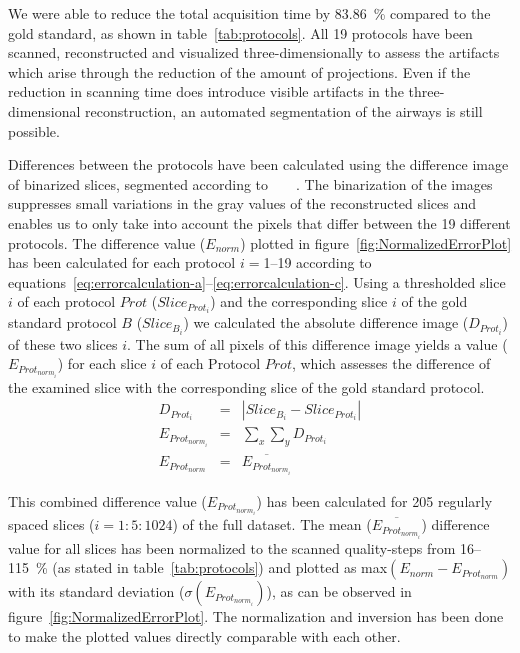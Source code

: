 We were able to reduce the total acquisition time by \SI{83.86}{\percent} compared to the gold standard, as shown in table~\ref{tab:protocols}. All 19 protocols have been scanned, reconstructed and visualized three-dimensionally to assess the artifacts which arise through the reduction of the amount of projections. Even if the reduction in scanning time does introduce visible artifacts in the three-dimensional reconstruction, an automated segmentation of the airways is still possible.

Differences between the protocols have been calculated using the difference image of binarized slices, segmented according to%
\ifhtml
	~\citet{Otsu1979}
\else
	~
\fi%
. The binarization of the images suppresses small variations in the gray values of the reconstructed slices and enables us to only take into account the pixels that differ between the 19 different protocols. The difference value ($E_{norm}$) plotted in figure~\ref{fig:NormalizedErrorPlot} has been calculated for each protocol $i=$1--19 according to equations~\ref{eq:errorcalculation-a}--\ref{eq:errorcalculation-c}. Using a thresholded slice $i$ of each protocol $Prot$ ($Slice_{Prot_{i}}$) and the corresponding slice $i$ of the gold standard protocol $B$ ($Slice_{B_{i}}$) we calculated the absolute difference image ($D_{Prot_{i}}$) of these two slices $i$. The sum of all pixels of this difference image yields a value ($E_{Prot_{norm_{i}}}$) for each slice $i$ of each Protocol $Prot$, which assesses the difference of the examined slice with the corresponding slice of the gold standard protocol.
\begin{eqnarray}%
	D_{Prot_{i}} &=& |Slice_{B_{i}}-Slice_{Prot_{i}}|\label{eq:errorcalculation-a}\\%
	E_{Prot_{norm_{i}}} &=& \sum_{x}\sum_{y} D_{Prot_{i}}\label{eq:errorcalculation-b}\\%
	E_{Prot_{norm}} &=& \overline{E_{Prot_{norm_{i}}}}\label{eq:errorcalculation-c}%
\end{eqnarray}%

This combined difference value ($E_{Prot_{norm_{i}}}$) has been calculated for 205 regularly spaced slices ($i=1:5:1024$) of the full dataset. The mean ($\overline{E_{Prot_{norm_{i}}}}$) difference value for all slices has been normalized to the scanned quality-steps from 16--\SI{115}{\percent} (as stated in table~\ref{tab:protocols}) and plotted as max$(E_{norm}-E_{Prot_{norm}})$ with its standard deviation ($\sigma(E_{Prot_{norm_{i}}})$), as can be observed in figure~\ref{fig:NormalizedErrorPlot}. The normalization and inversion has been done to make the plotted values directly comparable with each other.


